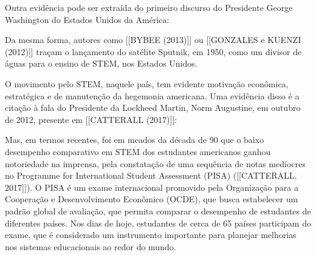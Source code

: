 Outra evidência pode ser extraída do primeiro discurso do Presidente George Washington do Estados Unidos da América:


\noindent\begin{center}\mbox{\centering{}}\end{center}


Da mesma forma, autores como  [[BYBEE (2013)]]  ou  [[GONZALES e KUENZI (2012)]] traçam o lançamento do satélite Sputnik, em 1950, como um divisor de águas para o ensino de STEM, nos Estados Unidos.

O movimento pelo STEM, naquele país, tem evidente motivação econômica, estratégica e de manutenção da hegemonia americana. Uma evidência disso é a citação à fala do Presidente da Lockheed Martin, Norm Augustine, em outubro de 2012, presente em  [[CATTERALL (2017)]]:


\noindent\begin{center}\mbox{\centering{}}\end{center}


Mas, em termos recentes, foi em meados da década de 90 que o baixo desempenho comparativo em STEM dos estudantes americanos ganhou notoriedade na imprensa, pela constatação de uma sequência de notas medíocres no Programme for International Student Assessment (PISA)  ([[CATTERALL, 2017]]). O PISA é um exame internacional promovido pela Organização para a Cooperação e Desenvolvimento Econômico (OCDE), que busca estabelecer um padrão global de avaliação, que permita comparar o desempenho de estudantes de diferentes países. Nos dias de hoje, estudantes de cerca de 65 países participam do exame, que é considerado um instrumento importante para planejar melhorias nos sistemas educacionais ao redor do mundo.

